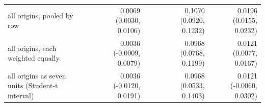 \begin{tabular}{lrrrrrr}
all origins, pooled by row &  & 0.0069 (0.0030, 0.0106) &  &  & 0.1070 (0.0920, 0.1232) & 0.0196 (0.0155, 0.0232) \\
all origins, each weighted equally &  & 0.0036 (-0.0009, 0.0079) &  &  & 0.0968 (0.0768, 0.1199) & 0.0121 (0.0077, 0.0167) \\
all origins as seven units (Student-t interval) &  & 0.0036 (-0.0120, 0.0191) &  &  & 0.0968 (0.0533, 0.1403) & 0.0121 (-0.0060, 0.0302) \\
\bottomrule
\end{tabular}
